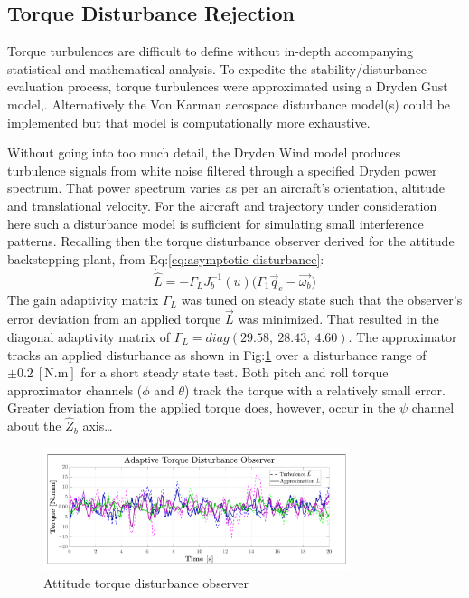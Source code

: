 \subsection{Torque Disturbance Rejection}
\label{subsec:simulation.disturbance.torque}
Torque turbulences are difficult to define without in-depth accompanying statistical and mathematical analysis. To expedite the stability/disturbance evaluation process, torque turbulences were approximated using a Dryden Gust model,\cite{optimalgust,discretegustmodel}. Alternatively the Von Karman aerospace disturbance model(s) could be implemented but that model is computationally more exhaustive.
\par
Without going into too much detail, the Dryden Wind model produces turbulence signals from white noise filtered through a specified Dryden power spectrum. That power spectrum varies as per an aircraft's orientation, altitude and translational velocity. For the aircraft and trajectory under consideration here such a disturbance model is sufficient for simulating small interference patterns. Recalling then the torque disturbance observer derived for the attitude backstepping plant, from Eq:\ref{eq:asymptotic-disturbance}:
\begin{equation}\label{eq:stability-torque-overserver}
\dot{\hat{L}}=-\Gamma_L J_b^{-1}(u)\big(\Gamma_1\vec{q}_e-\vec{\omega_b}\big)
\end{equation}
The gain adaptivity matrix $\Gamma_L$ was tuned on steady state such that the observer's error deviation from an applied torque $\vec{L}$ was minimized. That resulted in the diagonal adaptivity matrix of $\Gamma_L=diag(29.58,~28.43,~4.60)$. The approximator tracks an applied disturbance as shown in Fig:\ref{fig:torque-observer} over a disturbance range of $\pm 0.2~[\text{N.m}]$ for a short steady state test. Both pitch and roll torque approximator channels ($\phi$ and $\theta$) track the torque with a relatively small error. Greater deviation from the applied torque does, however, occur in the $\psi$ channel about the $\hat{Z}_b$ axis\ldots
\begin{figure}[htbp]
\vspace{-12pt}
\centering
\includegraphics[width=0.8\textwidth]{graphs/torque-observer}
\vspace{-12pt}
\caption{Attitude torque disturbance observer}
\vspace{-16pt}
\label{fig:torque-observer}
\end{figure}
